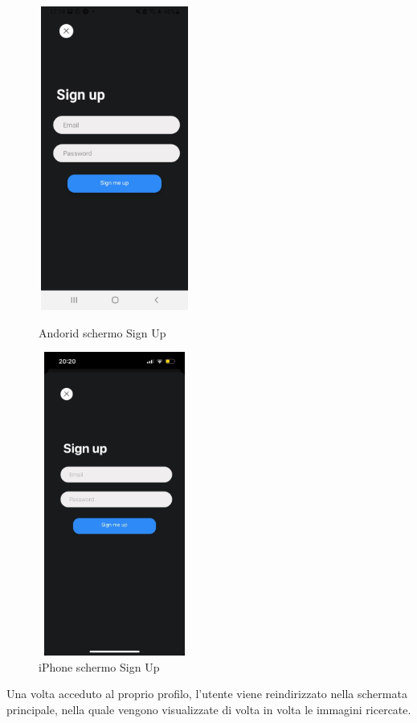 \begin{figure}[H]
\begin{minipage}[h]{0.47\textwidth}
        \centering
        \includegraphics[width=5cm, height=10cm]{images/immaginiAndroid/signUp.jpg}
        \caption{\label{signUnAndroid} Andorid schermo Sign Up}
    \end{minipage}
    \hfill
    \begin{minipage}[h]{0.47\textwidth}
        \centering
        \includegraphics[width=5cm, height=10cm]{images/immaginiPhone/signUp.jpeg}
        \caption{\label{signUniPhone}iPhone schermo Sign Up}
    \end{minipage}
\end{figure}
Una volta acceduto al proprio profilo, l'utente viene reindirizzato nella schermata principale, nella quale vengono visualizzate di volta in volta le immagini ricercate.
